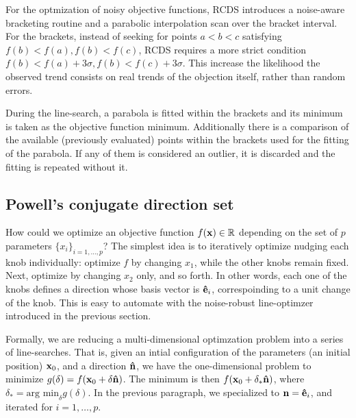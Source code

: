 For the optmization of noisy objective functions, RCDS introduces a noise-aware bracketing routine and a parabolic interpolation scan over the bracket interval. For the brackets, instead of seeking for points $a<b<c$ satisfying $f(b)< f(a), f(b) < f(c)$, RCDS requires a more strict condition $f(b)< f(a)+3\sigma, f(b) < f(c)+3\sigma$. This increase the likelihood the observed trend consists on real trends of the objection itself, rather than random errors.

During the line-search, a parabola is fitted within the brackets and its minimum is taken as the objective function minimum. Additionally there is a comparison of the available (previously evaluated) points within the brackets used for the fitting of the parabola. If any of them is considered an outlier, it is discarded and the fitting is repeated without it.


\subsection{Powell's conjugate direction set}
How could we optimize an objective function $f(\vb{x})\in\mathbb{R}$ depending on the set of $p$ parameters $\{x_i\}_{i=1,\dots,p}$? The simplest idea is to iteratively optimize nudging each knob individually: optimize $f$ by changing $x_1$, while the other knobs remain fixed. Next, optimize by changing $x_2$ only, and so forth. In other words, each one of the knobs defines a direction whose basis vector is $\vu{e}_i$, correspoinding to a unit change of the knob. This is easy to automate with the noise-robust line-optimzer introduced in the previous section.

Formally, we are reducing a multi-dimensional optimzation problem into a series of line-searches. That is, given an intial configuration of the parameters (an initial position) $\vb{x}_0$, and a direction $\vu{n}$, we have the one-dimensional problem to minimize $g(\delta)=f(\vb{x}_0 + \delta \vu{n})$. The minimum is  then $f(\vb{x}_0 + \delta_* \vu{n})$, where $\delta_* = \text{arg min}_\delta g(\delta)$. In the previous paragraph, we specialized to $\vb{n}=\vu{e}_i$, and iterated for $i=1,\dots, p$.



